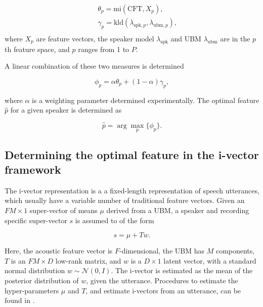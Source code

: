 \documentclass[preprint,12pt,5p]{elsarticle}
\begin{document}
\begin{eqnarray*}
&& \theta_p = \textrm{mi}(\textrm{CFT},X_{p}), \\
&& \gamma_p =
\textrm{kld}(\lambda_{\textrm{spk},p},\lambda_{\textrm{ubm},p}), \\
\end{eqnarray*} 
where $X_p$ are feature vectors, the speaker model $\lambda_{\textrm{spk}}$ and 
UBM $\lambda_{\textrm{ubm}}$ are in the $p$th feature space, and $p$ ranges from 1 to $P$.




A linear combination of these two measures is determined 

\begin{equation}
\phi_p = \alpha \theta_p  + (1-\alpha) \gamma_p,
\label{eq:phiFunc}
\end{equation}

where $\alpha$ is a weighting parameter determined experimentally. The optimal
feature $\hat{p}$ for a given speaker is determined as 

\begin{equation}
\hat{p} = \arg\max_p \{\phi_p\}.
\label{eq:ubm_optFeat}
\end{equation}

\subsection{Determining the optimal feature in the i-vector framework}
\label{subsec:ivec_optFeat}

The i-vector representation \cite{dehak_ivector} is a a fixed-length
representation of speech utterances, which usually have a variable number of
traditional feature vectors.  Given an $FM \times 1$ super-vector of means $\mu$
derived from a UBM, a speaker and recording specific super-vector $s$ is assumed to of
the form

\begin{equation}
s = \mu + T w.
\end{equation}

Here, the acoustic feature vector is $F$-dimensional, the UBM has $M$ components,
$T$ is an $FM \times D$ low-rank matrix, and $w$ is a $D \times 1$ latent
vector, with a standard normal distribution $w \sim \mathcal{N}(0,I)$. The
i-vector is estimated as the mean of the posterior distribution of $w$, given
the utterance. Procedures to estimate the hyper-parameters $\mu$ and $T$, and 
estimate i-vectors from an utterance, can be found in \cite{dehak_ivector}.
\end{document}
